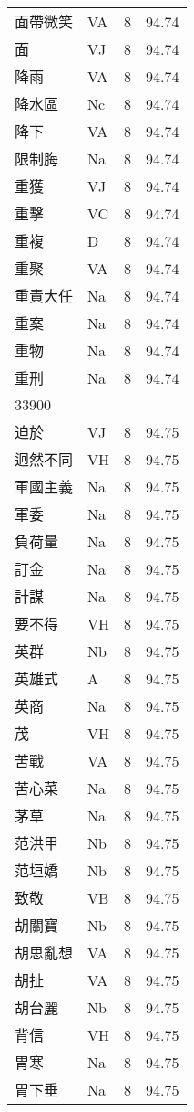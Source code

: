 \documentclass[twocolumn]{book}
\begin{document}
\begin{supertabular}{llrr}
面帶微笑 & VA & 8 &  94.74\\
面 & VJ & 8 &  94.74\\
降雨 & VA & 8 &  94.74\\
降水區 & Nc & 8 &  94.74\\
降下 & VA & 8 &  94.74\\
限制脢 & Na & 8 &  94.74\\
重獲 & VJ & 8 &  94.74\\
重擊 & VC & 8 &  94.74\\
重複 & D & 8 &  94.74\\
重聚 & VA & 8 &  94.74\\
重責大任 & Na & 8 &  94.74\\
重案 & Na & 8 &  94.74\\
重物 & Na & 8 &  94.74\\
重刑 & Na & 8 &  94.74\\
33900\\
迫於 & VJ & 8 &  94.75\\
迥然不同 & VH & 8 &  94.75\\
軍國主義 & Na & 8 &  94.75\\
軍委 & Na & 8 &  94.75\\
負荷量 & Na & 8 &  94.75\\
訂金 & Na & 8 &  94.75\\
計謀 & Na & 8 &  94.75\\
要不得 & VH & 8 &  94.75\\
英群 & Nb & 8 &  94.75\\
英雄式 & A & 8 &  94.75\\
英商 & Na & 8 &  94.75\\
茂 & VH & 8 &  94.75\\
苦戰 & VA & 8 &  94.75\\
苦心菜 & Na & 8 &  94.75\\
茅草 & Na & 8 &  94.75\\
范洪甲 & Nb & 8 &  94.75\\
范垣嬌 & Nb & 8 &  94.75\\
致敬 & VB & 8 &  94.75\\
胡關寶 & Nb & 8 &  94.75\\
胡思亂想 & VA & 8 &  94.75\\
胡扯 & VA & 8 &  94.75\\
胡台麗 & Nb & 8 &  94.75\\
背信 & VH & 8 &  94.75\\
胃寒 & Na & 8 &  94.75\\
胃下垂 & Na & 8 &  94.75\\

\end{supertabular}
\end{document}
